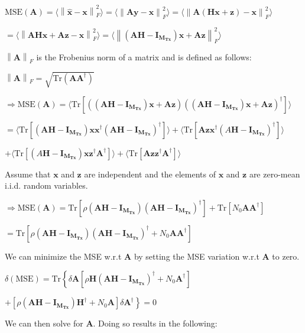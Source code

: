 \documentclass[fleqn]{article}
\newcommand{\norm}[1]{\left \lVert #1 \right \rVert}
\begin{document}
\begin{enumerate}
		$\text{MSE}(\mathbf{A}) = \langle \norm{\mathbf{\hat{x}} - \mathbf{x}}^2_F \rangle = \langle \norm{\mathbf{Ay} - \mathbf{x}}^2_F \rangle = \langle \norm{\mathbf{A}(\mathbf{Hx} + \mathbf{z}) - \mathbf{x}}^2_F \rangle$
		
		$ = \langle \norm{\mathbf{AHx} + \mathbf{Az} - \mathbf{x}}^2_F \rangle = \langle \norm{(\mathbf{AH} - \mathbf{I_{M_{Tx}}})\mathbf{x} + \mathbf{Az}}^2_F \rangle$
		
		$\norm{\mathbf{A}}_F$ is the Frobenius norm of a matrix and is defined as follows:
		
		$\norm{\mathbf{A}}_F = \sqrt{\text{Tr}(\mathbf{AA^{\dagger}})}$
		
		$\Rightarrow \text{MSE}(\mathbf{A}) = \langle \text{Tr}[((\mathbf{AH} - \mathbf{I_{M_{Tx}}})\mathbf{x} + \mathbf{Az})((\mathbf{AH} - \mathbf{I_{M_{Tx}}})\mathbf{x} + \mathbf{Az})^{\dagger}]\rangle$
		
		$ = \langle \text{Tr}[(\mathbf{AH} - \mathbf{I_{M_{Tx}}})\mathbf{xx^{\dagger}}(\mathbf{AH} - \mathbf{I_{M_{Tx}}})^{\dagger}] \rangle + \langle \text{Tr}[\mathbf{Azx^{\dagger}}(A\mathbf{H} - \mathbf{I_{M_{Tx}}})^{\dagger}] \rangle$
		
		$ + \langle \text{Tr}[(A\mathbf{H} - \mathbf{I_{M_{Tx}}})\mathbf{xz^{\dagger}A^{\dagger}}] \rangle + \langle \text{Tr}[\mathbf{Azz^{\dagger}A^{\dagger}}] \rangle$
		
		Assume that $\mathbf{x}$ and $\mathbf{z}$ are independent and the elements of $\mathbf{x}$ and $\mathbf{z}$ are zero-mean i.i.d. random variables.
		
		$\Rightarrow \text{MSE}(\mathbf{A}) = \text{Tr}[\rho(\mathbf{AH} - \mathbf{I_{M_{Tx}}})(\mathbf{AH} - \mathbf{I_{M_{Tx}}})^{\dagger}] + \text{Tr}[N_0\mathbf{AA^{\dagger}}]$
		
		$ = \text{Tr}[\rho(\mathbf{AH} - \mathbf{I_{M_{Tx}}})(\mathbf{AH} - \mathbf{I_{M_{Tx}}})^{\dagger} + N_0\mathbf{AA^{\dagger}}]$
		
		We can minimize the MSE w.r.t $\mathbf{A}$ by setting the MSE variation w.r.t $\mathbf{A}$ to zero.
		
		$\delta(\text{MSE}) = \text{Tr}\left\{\delta\mathbf{A}[\rho\mathbf{H}(\mathbf{AH} - \mathbf{I_{M_{Tx}}})^{\dagger} + N_0\mathbf{A}^{\dagger}]\right.$
		
		$ \left. + [\rho(\mathbf{AH} - \mathbf{I_{M_{Tx}}})\mathbf{H}^{\dagger} + N_0\mathbf{A}]\delta\mathbf{A}^{\dagger}\right\} = 0$
		
		We can then solve for $\mathbf{A}$. Doing so results in the following:
		

\end{enumerate}
\end{document}

